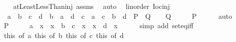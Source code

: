 \begin{isabellebody}
%
\isadelimproof
\ \ %
\endisadelimproof
%
\isatagproof
{}\isamarkupfalse%
\ atLeastLessThan{\isacharunderscore}{\kern0pt}inj\ assms\ \isamarkupfalse%
\ auto%
\endisatagproof
{\isafoldproof}%
%
\isadelimproof
\isanewline
%
\endisadelimproof
\isanewline
{}\isamarkupfalse%
\ {\isacharparenleft}{\kern0pt}\ linorder{\isacharparenright}{\kern0pt}\ Ioc{\isacharunderscore}{\kern0pt}inj{\isacharcolon}{\kern0pt}\ \isanewline
\ \ {\isacartoucheopen}{\isacharbraceleft}{\kern0pt}a\ {\isacharless}{\kern0pt}{\isachardot}{\kern0pt}{\isachardot}{\kern0pt}\ b{\isacharbraceright}{\kern0pt}\ {\isacharequal}{\kern0pt}\ {\isacharbraceleft}{\kern0pt}c\ {\isacharless}{\kern0pt}{\isachardot}{\kern0pt}{\isachardot}{\kern0pt}\ d{\isacharbraceright}{\kern0pt}\ {\isasymlongleftrightarrow}\ {\isacharparenleft}{\kern0pt}b\ {\isasymle}\ a\ {\isasymand}\ d\ {\isasymle}\ c{\isacharparenright}{\kern0pt}\ {\isasymor}\ a\ {\isacharequal}{\kern0pt}\ c\ {\isasymand}\ b\ {\isacharequal}{\kern0pt}\ d{\isacartoucheclose}\ {\isacharparenleft}{\kern0pt}\ {\isacartoucheopen}{\isacharquery}{\kern0pt}P\ {\isasymlongleftrightarrow}\ {\isacharquery}{\kern0pt}Q{\isacartoucheclose}{\isacharparenright}{\kern0pt}\isanewline
%
\isadelimproof
%
\endisadelimproof
%
\isatagproof
{}\isamarkupfalse%
\isanewline
\ \ \isamarkupfalse%
\ {\isacharquery}{\kern0pt}Q\isanewline
\ \ \isamarkupfalse%
\ \isamarkupfalse%
\ {\isacharquery}{\kern0pt}P\isanewline
\ \ \ \ \isamarkupfalse%
\ auto\isanewline
{}\isamarkupfalse%
\isanewline
\ \ \isamarkupfalse%
\ {\isacharquery}{\kern0pt}P\isanewline
\ \ \isamarkupfalse%
\ \isamarkupfalse%
\ {\isacartoucheopen}a\ {\isacharless}{\kern0pt}\ x\ {\isasymand}\ x\ {\isasymle}\ b\ {\isasymlongleftrightarrow}\ c\ {\isacharless}{\kern0pt}\ x\ {\isasymand}\ x\ {\isasymle}\ d{\isacartoucheclose}\ \ x\isanewline
\ \ \ \ \isamarkupfalse%
\ {\isacharparenleft}{\kern0pt}simp\ add{\isacharcolon}{\kern0pt}\ set{\isacharunderscore}{\kern0pt}eq{\isacharunderscore}{\kern0pt}iff{\isacharparenright}{\kern0pt}\isanewline
\ \ \isamarkupfalse%
\ this\ {\isacharbrackleft}{\kern0pt}of\ a{\isacharbrackright}{\kern0pt}\ this\ {\isacharbrackleft}{\kern0pt}of\ b{\isacharbrackright}{\kern0pt}\ this\ {\isacharbrackleft}{\kern0pt}of\ c{\isacharbrackright}{\kern0pt}\ this\ {\isacharbrackleft}{\kern0pt}of\ d{\isacharbrackright}{\kern0pt}\ \isamarkupfalse%

\end{isabellebody}
